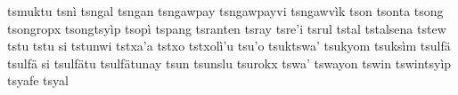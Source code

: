 \documentclass[a4paper]{article}
\begin{document}
tsmuktu\hspace{2mm}
tsnì\hspace{2mm}
tsngal\hspace{2mm}
tsngan\hspace{2mm}
tsngawpay\hspace{2mm}
tsngawpayvi\hspace{2mm}
tsngawvìk\hspace{2mm}
tson\hspace{2mm}
tsonta\hspace{2mm}
tsong\hspace{2mm}
tsongropx\hspace{2mm}
tsongtsyìp\hspace{2mm}
tsopì\hspace{2mm}
tspang\hspace{2mm}
tsranten\hspace{2mm}
tsray\hspace{2mm}
tsre'i\hspace{2mm}
tsrul\hspace{2mm}
tstal\hspace{2mm}
tstalsena\hspace{2mm}
tstew\hspace{2mm}
tstu\hspace{2mm}
tstu si\hspace{2mm}
tstunwi\hspace{2mm}
tstxa'a\hspace{2mm}
tstxo\hspace{2mm}
tstxolì'u\hspace{2mm}
tsu'o\hspace{2mm}
tsuktswa'\hspace{2mm}
tsukyom\hspace{2mm}
tsuksìm\hspace{2mm}
tsulfä\hspace{2mm}
tsulfä si\hspace{2mm}
tsulfätu\hspace{2mm}
tsulfätunay\hspace{2mm}
tsun\hspace{2mm}
tsunslu\hspace{2mm}
tsurokx\hspace{2mm}
tswa'\hspace{2mm}
tswayon\hspace{2mm}
tswin\hspace{2mm}
tswintsyìp\hspace{2mm}
tsyafe\hspace{2mm}
tsyal\hspace{2mm}
\end{document}

